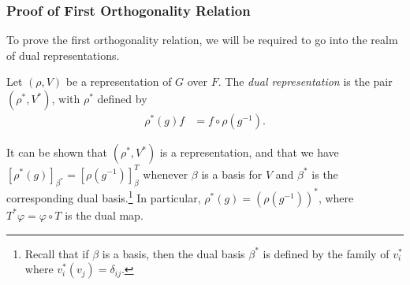 \documentclass[10pt]{mypackage}
\begin{document}
\subsubsection{Proof of First Orthogonality Relation}%
To prove the first orthogonality relation, we will be required to go into the realm of dual representations.
\begin{definition}
  Let $\left( \rho,V \right)$ be a representation of $G$ over $F$. The \textit{dual representation} is the pair $\left( \rho^{\ast},V^{\ast} \right)$, with $\rho^{\ast}$ defined by
  \begin{align*}
    \rho^{\ast}(g)f &= f\circ \rho\left( g^{-1} \right).
  \end{align*}
\end{definition}
It can be shown that $\left( \rho^{\ast},V^{\ast} \right)$ is a representation, and that we have $\left[ \rho^{\ast}\left( g \right) \right]_{\beta^{\ast}} = \left[ \rho\left( g^{-1} \right) \right]_{\beta}^{T}$ whenever $\beta$ is a basis for $V$ and $\beta^{\ast}$ is the corresponding dual basis.\footnote{Recall that if $\beta$ is a basis, then the dual basis $\beta^{\ast}$ is defined by the family of $v_i^{\ast}$ where $v_i^{\ast}\left( v_j \right) = \delta_{ij}$.} In particular, $\rho^{\ast}\left( g \right) = \left( \rho\left( g^{-1} \right) \right)^{\ast}$, where $T^{\ast}\varphi = \varphi\circ T$ is the dual map.
\end{document}
